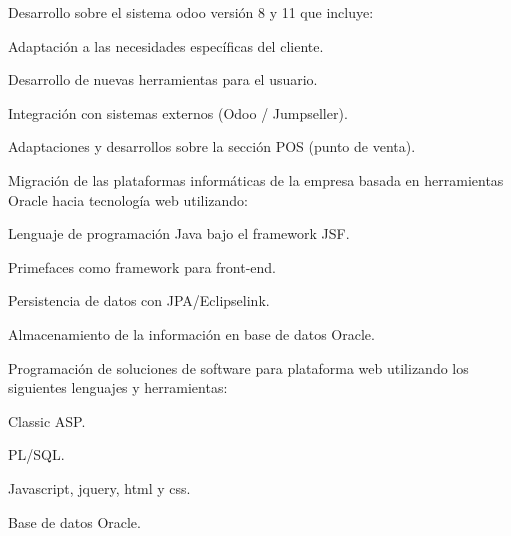 \documentclass[letterpaper]{twentysecondcv} %
\begin{document}
\begin{twenty} %
	{
		Desarrollo sobre el sistema odoo versión 8 y 11 que incluye:
		\begin{compactitem}[\color{blue}$\circ$]
			\item Adaptación a las necesidades específicas del cliente.
			\item Desarrollo de nuevas herramientas para el usuario.
			\item Integración con sistemas externos (Odoo / Jumpseller).
			\item Adaptaciones y desarrollos sobre la sección POS (punto de venta).
		\end{compactitem}
	}
	{
		Migración de las plataformas informáticas de la empresa basada en herramientas
		Oracle hacia tecnología web utilizando:
		\begin{compactitem}[\color{blue}$\circ$]
			\item Lenguaje de programación Java bajo el framework JSF.
			\item Primefaces como framework para front-end.
			\item Persistencia de datos con JPA/Eclipselink.
			\item Almacenamiento de la información en base de datos Oracle.
		\end{compactitem}
	}
	{
		Programación de soluciones de software para plataforma web utilizando los
		siguientes lenguajes y herramientas:
		\begin{compactitem}[\color{blue}$\circ$]
			\item Classic ASP. 
			\item PL/SQL.
			\item Javascript, jquery, html y css.
			\item Base de datos Oracle.
		\end{compactitem}
	}
\end{twenty}



\end{document}
